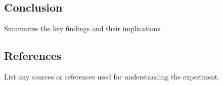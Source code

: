 \documentclass{article}
\begin{document}
\subsection{Conclusion}
Summarize the key findings and their implications.

\subsection{References}
List any sources or references used for understanding the experiment.

\newpage
\listoftables

\listoffigures
\end{document}
